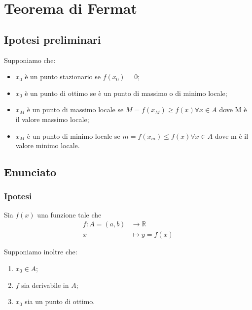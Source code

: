 \documentclass[../dimostrazioni]{subfiles}
\begin{document}
    \chapter{Teorema di Fermat}
    \label{teoFermat}

        \section*{Ipotesi preliminari}

            Supponiamo che:

            \begin{itemize}
                \item \(x_0\) è un punto stazionario se \(f(x_0) = 0\);
                \item \(x_0\) è un punto di ottimo se è un punto di massimo o di minimo locale;
                \item \(x_M\) è un punto di massimo locale se  \(M = f(x_M) \geqslant f(x) \forall  x \in A\) dove M è il valore massimo locale;
                \item \(x_M\) è un punto di minimo locale se  \(m = f(x_m) \leqslant f(x) \forall  x \in A\) dove m è il valore minimo locale.
            \end{itemize}

        \section*{Enunciato}

            \subsection*{Ipotesi}

                Sia \(f(x)\) una funzione tale che
                \begin{align*}
                    f : A = (a, b) &\longrightarrow \mathbb{R}\\
                    x &\longmapsto y = f(x) 
                \end{align*}

                Supponiamo inoltre che:

            \begin{enumerate}
                \indentitem \item \(x_0 \in A\);
                \indentitem \item \(f\) sia derivabile in \(A\);
                \indentitem \item \(x_0\) sia un punto di ottimo.
            \end{enumerate}
\end{document}
